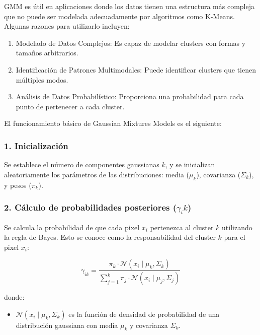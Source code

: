 GMM es útil en aplicaciones donde los datos tienen una estructura más compleja que no puede ser modelada adecuadamente por algoritmos como K-Means. Algunas razones para utilizarlo incluyen:

\begin{enumerate}
\setlength{\itemsep}{-1ex}
   \item{\begin{flushleft} Modelado de Datos Complejos: Es capaz de modelar clusters con formas y tamaños arbitrarios. \end{flushleft}}
   \item{\begin{flushleft} Identificación de Patrones Multimodales: Puede identificar clusters que tienen múltiples modos. \end{flushleft}}
   \item{\begin{flushleft} Análisis de Datos Probabilístico: Proporciona una probabilidad para cada punto de pertenecer a cada cluster. \end{flushleft}}
\end{enumerate}

El funcionamiento básico de Gaussian Mixtures Models es el siguiente:

\subsubsection{1. Inicialización}

Se establece el número de componentes gaussianas $k$, y se inicializan aleatoriamente los parámetros de las distribuciones: media ($\mu_k$), covarianza ($\Sigma_k$), y pesos ($\pi_k$).

\subsubsection{2. Cálculo de probabilidades posteriores ($\gamma_i k$)}

Se calcula la probabilidad de que cada pixel $x_i$ pertenezca al cluster $k$ utilizando la regla de Bayes. Esto se conoce como la responsabilidad del cluster $k$ para el pixel $x_i$:

$$\gamma_{ik} =\frac{\pi_k \cdot \mathcal{N}(x_i \mid \mu_k ,\Sigma_k )}{\sum_{j=1}^k \pi_j \cdot \mathcal{N}(x_i \mid \mu_j ,\Sigma_j )}$$

donde:

\begin{itemize}
\setlength{\itemsep}{-1ex}
   \item{\begin{flushleft} $\mathcal{N}(x_i \mid \mu_k ,\Sigma_k )$ es la función de densidad de probabilidad de una distribución gaussiana con media $\mu_k$ y covarianza $\Sigma_k$. \end{flushleft}}
\end{itemize}

